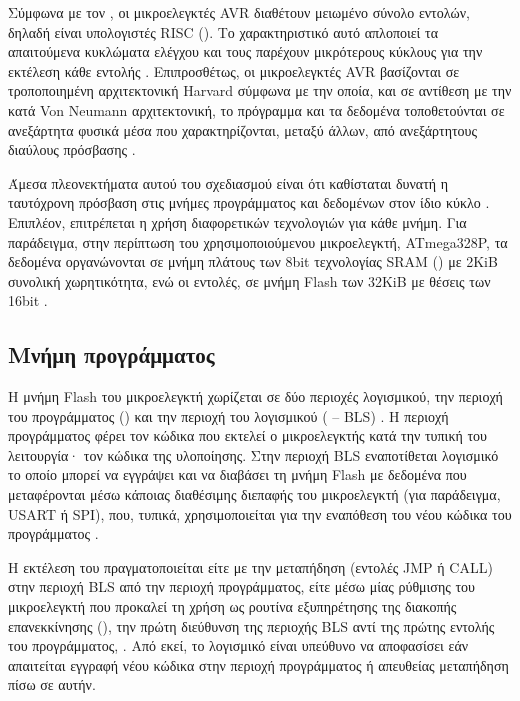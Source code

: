 Σύμφωνα με τον \textcite[1]{myklebust97}, οι μικροελεγκτές AVR διαθέτουν
μειωμένο σύνολο εντολών, δηλαδή είναι υπολογιστές RISC (). Το χαρακτηριστικό αυτό απλοποιεί τα απαιτούμενα κυκλώματα
ελέγχου και τους παρέχουν μικρότερους κύκλους για την εκτέλεση κάθε εντολής
\parencite[1]{sequin82}. Επιπροσθέτως, οι μικροελεγκτές AVR βασίζονται σε
τροποποιημένη αρχιτεκτονική Harvard σύμφωνα με την οποία, και σε αντίθεση με την
κατά Von Neumann αρχιτεκτονική, το πρόγραμμα και τα δεδομένα τοποθετούνται σε
ανεξάρτητα φυσικά μέσα που χαρακτηρίζονται, μεταξύ άλλων, από ανεξάρτητους
διαύλους πρόσβασης \parencite[1]{myklebust97}.

Άμεσα πλεονεκτήματα αυτού του σχεδιασμού είναι ότι καθίσταται δυνατή η
ταυτόχρονη πρόσβαση στις μνήμες προγράμματος και δεδομένων στον ίδιο κύκλο
\parencite[8]{atmel13}. Επιπλέον, επιτρέπεται η χρήση διαφορετικών τεχνολογιών
για κάθε μνήμη. Για παράδειγμα, στην περίπτωση του χρησιμοποιούμενου
μικροελεγκτή, ATmega328P, τα δεδομένα οργανώνονται σε μνήμη πλάτους των 8bit
τεχνολογίας SRAM () με 2KiB συνολική χωρητικότητα, ενώ οι
εντολές, σε μνήμη Flash των 32KiB με θέσεις των 16bit
\parencite[8--9,16,18]{atmel13}.


\subsection{Μνήμη προγράμματος}
\label{subsec:avr:progmem}

Η μνήμη Flash του μικροελεγκτή χωρίζεται σε δύο περιοχές λογισμικού, την περιοχή
του προγράμματος () και την περιοχή του λογισμικού
 ( -- BLS) \parencite[269]{atmel13}.
Η περιοχή προγράμματος φέρει τον κώδικα που εκτελεί ο μικροελεγκτής κατά την
τυπική του λειτουργία· τον κώδικα της υλοποίησης. Στην περιοχή BLS εναποτίθεται
λογισμικό το οποίο μπορεί να εγγράψει και να διαβάσει τη μνήμη Flash με δεδομένα
που μεταφέρονται μέσω κάποιας διαθέσιμης διεπαφής του μικροελεγκτή (για
παράδειγμα, USART ή SPI), που, τυπικά, χρησιμοποιείται για την εναπόθεση του
νέου κώδικα του προγράμματος \parencite[269,273]{atmel13}.

Η εκτέλεση του  πραγματοποιείται είτε με την μεταπήδηση (εντολές
JMP ή CALL) στην περιοχή BLS από την περιοχή προγράμματος, είτε μέσω μίας
ρύθμισης του μικροελεγκτή που προκαλεί τη χρήση ως ρουτίνα εξυπηρέτησης της
διακοπής επανεκκίνησης (), την πρώτη διεύθυνση της περιοχής BLS αντί
της πρώτης εντολής του προγράμματος, \parencite[273]{atmel13}. Από εκεί, το
λογισμικό  είναι υπεύθυνο να αποφασίσει εάν απαιτείται εγγραφή
νέου κώδικα στην περιοχή προγράμματος ή απευθείας μεταπήδηση πίσω σε αυτήν.

